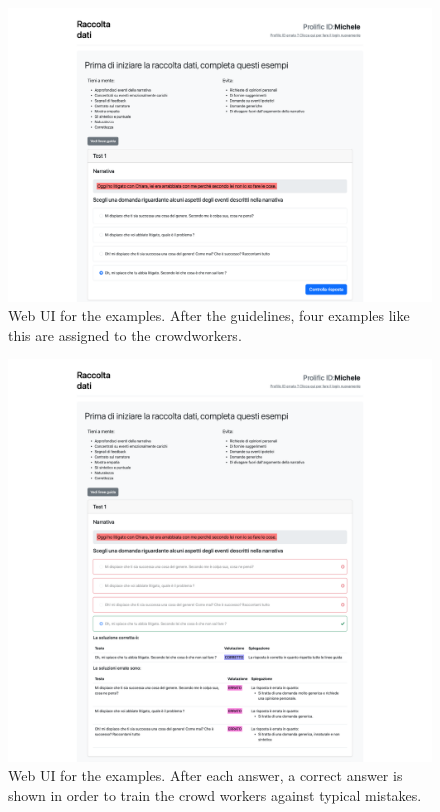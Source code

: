 \begin{figure}[!htbp]
    \centering
    \includegraphics[width=1\linewidth]{assets//imgs/UI-examples-1.png}
    \caption{Web UI for the examples. After the guidelines, four examples like this are assigned to the crowdworkers.}
    \label{fig:data_collection_web:2}
\end{figure}
\begin{figure}[!htbp]
    \centering
    \includegraphics[width=1\linewidth]{assets//imgs/UI-examples-completed-1.png}
    \caption{Web UI for the examples. After each answer, a correct answer is shown in order to train the crowd workers against typical mistakes.}
    \label{fig:data_collection_web:3}
\end{figure}
